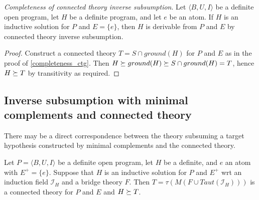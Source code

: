 \begin{thm}
\emph{Completeness of connected theory inverse subsumption}.
\label{completeness_ctis}
Let $\langle B, U, I \rangle$ be a definite open program,
let $H$ be a definite program, and let $e$ be an atom.
If $H$ is an inductive solution for $P$ and
$E = \{e\}$, then $H$ is derivable from $P$ and $E$ by connected theory inverse subsumption.
\end{thm}
\begin{proof}
Construct a connected theory $T=S \cap ground(H)$ for $P$ and $E$ as in the proof of \ref{completeness_ctg}.
Then $H \succeq ground(H) \succeq S \cap ground(H) = T$,
hence $H \succeq T$ by transitivity as required.
\end{proof}

\subsection{Inverse subsumption with minimal complements and connected theory}
There may be a direct correspondence between the theory subsuming a target hypothesis constructed by minimal complements and the connected theory.

\begin{conjecture}
Let $P=\langle B, U, I \rangle$ be a definite open program, let $H$ be a definite, and $e$ an atom with $E^+=\{e\}$. Suppose that $H$ is an inductive solution for $P$ and $E^+$ wrt an induction field $\mathcal{I}_H$ and a bridge theory $F$.
Then $T=\tau(M(F \cup Taut(\mathcal{I}_H)))$ is a connected theory for $P$ and $E$ and $H \succeq T$.
\end{conjecture}